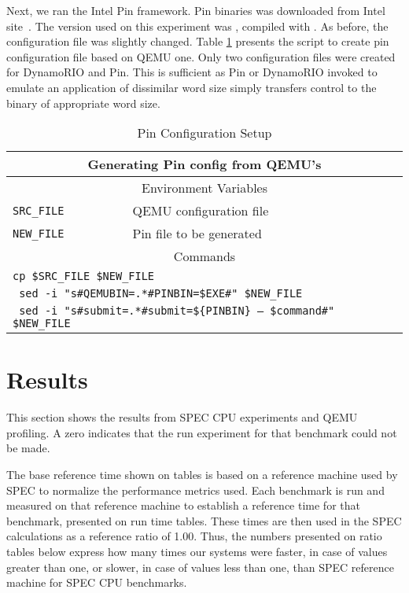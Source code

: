 \documentclass[11pt,twoside]{article}
\begin{document}
  Next, we ran the Intel Pin framework.
  Pin binaries was downloaded from Intel site~\cite{pinsrc}.
  The version used on this experiment was \pinversion, compiled
  with \pincompiler.
  As before, the configuration
  file was slightly changed. Table \ref{tab:pinconfig} presents the
  script to create pin configuration file based on QEMU one.
  Only two configuration files were created for DynamoRIO and Pin.
  This is sufficient as Pin or DynamoRIO invoked to emulate an application
  of dissimilar word size simply transfers control to the binary
  of appropriate word size.
  \begin{table}
  	  \begin{footnotesize}
	  \centering
	  \begin{tabular}{|l|l|}
	  \hline
	  \multicolumn{2}{|c|}{\bf %
	  	Generating Pin config from QEMU's} \\
	  \hline
	  \multicolumn{2}{|c|}{Environment Variables} \\
	  \hline
	  {\tt SRC\_FILE} & QEMU configuration file \\
	  {\tt NEW\_FILE} & Pin file to be generated \\
	  \hline
	  \multicolumn{2}{|c|}{Commands} \\
	  \hline
	  \multicolumn{2}{|l|}{\tt cp \$SRC\_FILE \$NEW\_FILE} \\
	  \multicolumn{2}{|l|}{\tt
					sed -i "s\#QEMUBIN=.*\#PINBIN=\$EXE\#"
						\$NEW\_FILE
		} \\
	  \multicolumn{2}{|l|}{\tt
					sed -i "s\#submit=.*\#submit=\$\{PINBIN\}
					--	\$command\#" \$NEW\_FILE
		} \\
	  \hline
	  \end{tabular}
	  \caption{Pin Configuration Setup}
	  \label{tab:pinconfig}
	  \end{footnotesize}
  \end{table}
  
\newpage
\section{Results}
  \label{sec:results}
  This section shows the results
  from SPEC CPU experiments and QEMU profiling.
  A zero indicates that the run experiment for 
  that benchmark could not be made.

  The base reference time shown on tables is based on a
  reference machine used by SPEC to normalize the
  performance metrics used. %
  Each benchmark is run and measured on that reference machine to 
  establish a reference time for that benchmark, presented on run
  time tables.
  These times are then used in the SPEC calculations as a
  reference ratio of 1.00. Thus, the numbers presented on ratio
  tables below express how many times our systems were faster,
  in case of values greater than one, or slower, in case of
  values less than one, than SPEC reference 
  machine for SPEC CPU benchmarks.
\end{document}
